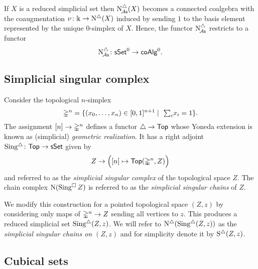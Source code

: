 If $X$ is a reduced simplicial set then $\operatorname{N^{\triangle}_{\!{\mathcal{A}\mathsf{s}}}}(X)$ becomes a connected coalgebra with the coaugmentation $\nu \colon \Bbbk \to \operatorname{N^{\triangle}}(X)$ induced by sending $1$ to the basis element represented by the unique $0$-simplex of $X$.
Hence, the functor $\operatorname{N^{\triangle}_{\!{\mathcal{A}\mathsf{s}}}}$ restricts to a functor
\[
\operatorname{N^{\triangle}_{\!{\mathcal{A}\mathsf{s}}}} \colon \mathsf{sSet}^0 \to \mathsf{coAlg}^0.
\]

\subsection{Simplicial singular complex}

Consider the topological $n$-simplex
\[
\mathbb{\Delta}^{n} = \{(x_0, \dots, x_n) \in [0,1]^{n+1} \mid \ \textstyle{\sum}_i x_i = 1\}.
\]
The assignment $[n] \to \mathbb{\Delta}^n$ defines a functor $\triangle \to \mathsf{Top}$ whose Yoneda extension is known as (simplicial) \textit{geometric realization}.
It has a right adjoint $\operatorname{Sing^{\triangle}} \colon \mathsf{Top} \to \mathsf{sSet}$ given by
\[
Z \to \Big( [n] \mapsto \mathsf{Top}(\mathbb{\Delta}^n, Z) \Big)
\]
and referred to as the \textit{simplicial singular complex} of the topological space $Z$.
The chain complex $\operatorname{N}(\operatorname{Sing^{\square}} Z)$ is referred to as the \textit{simplicial singular chains} of $Z$.

We modify this construction for a pointed topological space $(Z,z)$ by considering only maps of $\mathbb{\Delta}^n \to Z$ sending all vertices to $z$.
This produces a reduced simplicial set $\operatorname{Sing^{\triangle}}(Z,z)$.
We will refer to $\operatorname{N^{\triangle}}(\operatorname{Sing^{\triangle}}(Z,z))$ as the \textit{simplicial singular chains on $(Z,z)$} and for simplicity denote it by $\operatorname{S^{\triangle}}(Z,z)$.

\subsection{Cubical sets} \label{ss:cubical sets}

